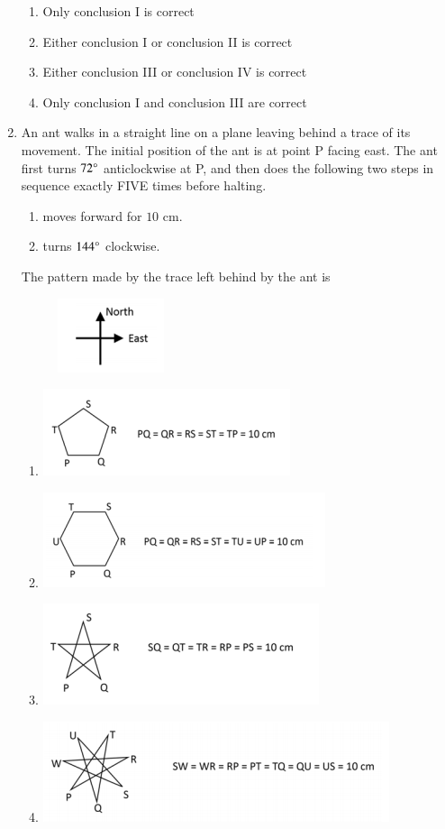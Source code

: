 \documentclass[a4paper,10pt]{article}
\begin{document}
\begin{enumerate}
\hfill{}
\begin{enumerate}
	\item Only conclusion I is correct
	\item Either conclusion I or conclusion II is correct
	\item Either conclusion III or conclusion IV is correct
	\item Only conclusion I and conclusion III are correct
\end{enumerate}

\item An ant walks in a straight line on a plane leaving behind a trace of its movement. The initial position of the ant is at point P facing east.
The ant first turns $72\degree$ anticlockwise at P, and then does the following two steps in sequence exactly FIVE times before halting.
\begin{enumerate}
	\item moves forward for $10$ cm.
	\item turns $144\degree$ clockwise.
\end{enumerate}
The pattern made by the trace left behind by the ant is
\begin{figure}[H]
	\centering
	\includegraphics[width=0.2\columnwidth]{q10.png}
	\caption*{}
	\label{fig:q10}
\end{figure}

\hfill{}
\begin{enumerate}
	\item \includegraphics[width=0.5\columnwidth]{q10A.png}
        \item \includegraphics[width=0.5\columnwidth]{q10B.png}
	\item \includegraphics[width=0.5\columnwidth]{q10C.png}
	\item \includegraphics[width=0.5\columnwidth]{q10D.png}
\end{enumerate}


\end{enumerate}
\end{document}
